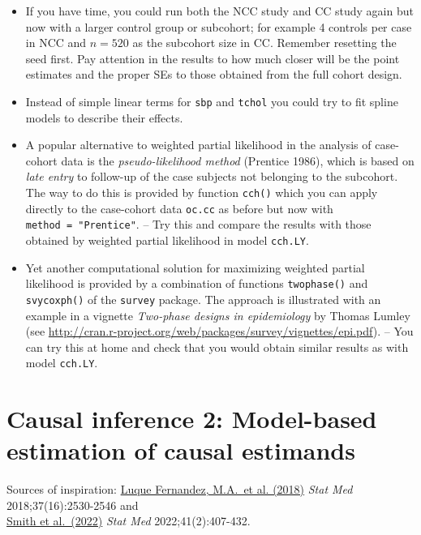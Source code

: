 \documentclass[
]{book}
\begin{document}
\begin{itemize}
\item
  If you have time, you could run both the NCC study and CC study
  again but now with a larger control group or subcohort;
  for example 4 controls per case in NCC and \(n=520\) as the subcohort size in CC.
  Remember resetting the seed first.
  Pay attention in the results to how much closer
  will be the point estimates and the proper SEs to those
  obtained from the full cohort design.
\item
  Instead of simple linear terms for \texttt{sbp} and \texttt{tchol} you could try to fit
  spline models to describe their effects.
\item
  A popular alternative to weighted partial likelihood
  in the analysis of case-cohort data is the \emph{pseudo-likelihood method}
  (Prentice 1986), which is based on \emph{late entry} to follow-up
  of the case subjects not belonging to
  the subcohort.
  The way to do this is provided by function \texttt{cch()} which
  you can apply directly to the case-cohort data \texttt{oc.cc} as before
  but now with \texttt{method\ =\ "Prentice"}. -- Try this and compare the results
  with those obtained by weighted partial likelihood in model
  \texttt{cch.LY}.
\item
  Yet another computational solution for
  maximizing weighted partial likelihood is provided by
  a combination of functions \texttt{twophase()}
  and \texttt{svycoxph()} of the \texttt{survey} package.
  The approach is illustrated with an example
  in a vignette \emph{Two-phase designs in epidemiology} by Thomas Lumley
  (see \url{http://cran.r-project.org/web/packages/survey/vignettes/epi.pdf}).
  -- You can try this at home and check that you would obtain similar results as
  with model \texttt{cch.LY}.
\end{itemize}

\chapter{Causal inference 2: Model-based estimation of causal estimands}\label{causal-inference-2-model-based-estimation-of-causal-estimands}

Sources of inspiration: \href{https://doi.org/10.1002/sim.7628}{Luque Fernandez, M.A.~et al.
(2018)} \emph{Stat Med}
2018;37(16):2530-2546 and\\
\href{https://doi.org/10.1002/sim.9234}{Smith et al.~(2022)} \emph{Stat Med}
2022;41(2):407-432.
\end{document}
